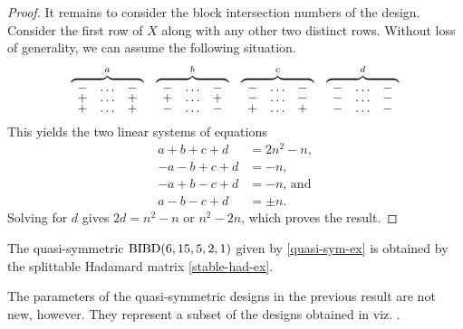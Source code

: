 \documentclass[../../../main]{subfiles}
\begin{document}
\begin{proof}
 It remains to consider the block intersection numbers of the design. Consider
 the first row of $X$ along with any other two distinct rows. Without loss of
 generality, we can assume the following situation. 
 \[
 \def\arraystretch{0.65}
  \begin{array}{cccc}
   \overbrace{
   \begin{array}{ccc}
   - & \dots & - \\ + & \dots & + \\ + & \dots & +
   \end{array}
   }^a
   &
   \overbrace{
   \begin{array}{ccc}
   - & \dots & - \\ + & \dots & + \\ - & \dots & -
   \end{array}
   }^b
   &
   \overbrace{
   \begin{array}{ccc}
   - & \dots & - \\ - & \dots & - \\ + & \dots & +
   \end{array}
   }^c
   &
   \overbrace{
   \begin{array}{ccc}
   - & \dots & - \\ - & \dots & - \\ - & \dots & -
   \end{array}
   }^d
  \end{array}
 \]
 This yields the two linear systems of equations
 \begin{align*}
  a + b + c + d &= 2n^2-n, \\
  - a - b + c + d &= -n, \\
  - a + b - c + d &= -n \text{, and} \\
  a - b - c + d &= \pm n.
 \end{align*}
 Solving for $d$ gives $2d = n^2-n \text{ or } n^2-2n$, which proves the result.
\end{proof}

\begin{ex}
 The quasi-symmetric $\text{BIBD}(6,15,5,2,1)$ given by \ref{quasi-sym-ex} is obtained by the splittable Hadamard matrix \ref{stable-had-ex}.
\end{ex}

The parameters of the quasi-symmetric designs in the previous result are not
new, however. They represent a subset of the designs obtained in
\cite{bracken-mcguire} viz. \cite{mcguire-grey-rankin-bound}. 

\dinkus
\end{document}
